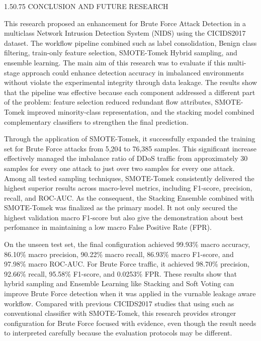 \documentclass[12pt,a4paper]{article}
\makeatletter
\renewcommand{\section}{\@startsection{section}{1}{0pt}%
  {1.5\baselineskip}{0.75\baselineskip}%
  {\normalfont\fontsize{13}{15.6}\selectfont\bfseries}}
\makeatother
\begin{document}
\section{CONCLUSION AND FUTURE RESEARCH}

This research proposed an enhancement for Brute Force Attack Detection in a multiclass Network Intrusion Detection System (NIDS) using the CICIDS2017 dataset. The workflow pipeline combined such as label consolidation, Benign class filtering, train-only feature selection, SMOTE-Tomek Hybrid sampling, and ensemble learning. The main aim of this research was to evaluate if this multi-stage approach could enhance detection accuracy in imbalanced environments without violate the experimental integrity through data leakage. The results show that the pipeline was effective because each component addressed a different part of the problem: feature selection reduced redundant flow attributes, SMOTE-Tomek improved minority-class representation, and the stacking model combined complementary classifiers to strengthen the final prediction.

Through the application of SMOTE-Tomek, it successfully expanded the training set for Brute Force attacks from 5,204 to 76,385 samples. This significant increase effectively managed the imbalance ratio of DDoS traffic from approximately 30 samples for every one attack to just over two samples for every one attack. Among all tested sampling techniques, SMOTE-Tomek consistently delivered the highest superior results across macro-level metrics, including F1-score, precision, recall, and ROC-AUC. As the consequent, the Stacking Ensemble combined with SMOTE-Tomek was finalized as the primary model. It not only secured the highest validation macro F1-score but also give the demonstration about best perfomance in maintaining a low macro False Positive Rate (FPR).

On the unseen test set, the final configuration achieved 99.93\% macro accuracy, 86.10\% macro precision, 90.22\% macro recall, 86.93\% macro F1-score, and 97.98\% macro ROC-AUC. For Brute Force traffic, it achieved 98.70\% precision, 92.66\% recall, 95.58\% F1-score, and 0.0253\% FPR. These results show that hybrid sampling and Ensemble Learning like Stacking and Soft Voting can improve Brute Force detection when it was applied in the vurnable leakage aware workflow. Compared with previous CICIDS2017 studies that using such as conventional classifier with SMOTE-Tomek, this research provides stronger configuration for Brute Force focused with evidence, even though the result needs to interpreted carefully because the evaluation protocols may be different.
\end{document}
